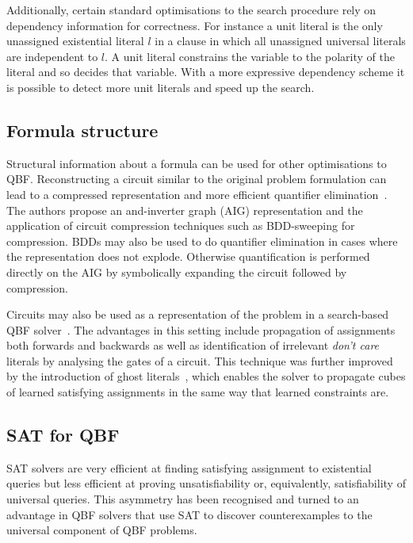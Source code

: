 Additionally, certain standard optimisations to the search procedure rely on dependency information for correctness. For instance a unit literal is the only unassigned existential literal $l$ in a clause in which all unassigned universal literals are independent to $l$. A unit literal constrains the variable to the polarity of the literal and so decides that variable. With a more expressive dependency scheme it is possible to detect more unit literals and speed up the search.

\subsection{Formula structure}

Structural information about a formula can be used for other optimisations to QBF. Reconstructing a circuit similar to the original problem formulation can lead to a compressed representation and more efficient quantifier elimination~\cite{Pigorsch10, Pigorsch09}. The authors propose an and-inverter graph (AIG) representation and the application of circuit compression techniques such as BDD-sweeping for compression. BDDs may also be used to do quantifier elimination in cases where the representation does not explode. Otherwise quantification is performed directly on the AIG by symbolically expanding the circuit followed by compression.

Circuits may also be used as a representation of the problem in a search-based QBF solver~\cite{Goultiaeva09}. The advantages in this setting include propagation of assignments both forwards and backwards as well as identification of irrelevant \emph{don't care} literals by analysing the gates of a circuit. This technique was further improved by the introduction of ghost literals~\cite{Klieber10}, which enables the solver to propagate cubes of learned satisfying assignments in the same way that learned constraints are.

\subsection{SAT for QBF}

SAT solvers are very efficient at finding satisfying assignment to existential queries but less efficient at proving unsatisfiability or, equivalently, satisfiability of universal queries. This asymmetry has been recognised and turned to an advantage in QBF solvers that use SAT to discover counterexamples to the universal component of QBF problems.

